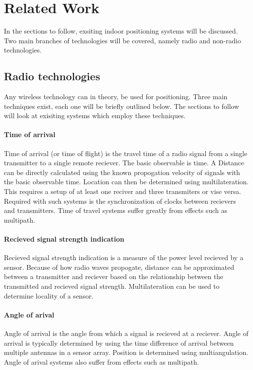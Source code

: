 \documentclass[11pt,a4paper]{article}
\begin{document}
\newpage
\section{Related Work}
	In the sections to follow, exsiting indoor positioning systems will be discussed. Two main branches of technologies will be covered, namely radio and non-radio technologies.
	
	\subsection{Radio technologies}
		Any wireless technology can in theory, be used for positioning. Three main techniques exist, each one will be briefly outlined below. The sections to follow will look at exisiting systems which employ these techniques.
	
	\paragraph{Time of arrival}
		Time of arrival (or time of flight) is the travel time of a radio signal from a single transmitter to a single remote reciever. The basic observable is time. A Distance can be directly calculated using the known propogation velocity of signals with the basic observable time. Location can then be determined using multilateration. This requires a setup of at least one reciver and three transmiters or vise versa.
		Required with such systems is the synchronization of clocks between recievers and transmitters.
		Time of travel systems suffer greatly from effects such as multipath.
		\cite{k._pahlavan_wideband_1998}
	
	\paragraph{Recieved signal strength indication}
		Recieved signal strength indication is a measure of the power level recieved by a sensor. Because of how radio waves propogate, distance can be approximated between a transmitter and reciever based on the relationship between the transmitted and recieved signal strength. Multilateration can be used to determine locality of a sensor.
	
	\paragraph{Angle of arival}
		Angle of arrival is the angle from which a signal is recieved at a reciever. Angle of arrival is typically determined by using the time difference of arrival between multiple antennas in a sensor array. Position is determined using multiangulation.
		Angle of arival systems also suffer from effects such as multipath.
	
\end{document}
